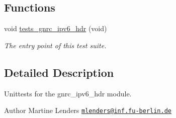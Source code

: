 \subsection*{Functions}
\begin{DoxyCompactItemize}
\item 
void \hyperlink{group__unittests_ga5f40f856d40dbcd2b69c5176f7038062}{tests\+\_\+gnrc\+\_\+ipv6\+\_\+hdr} (void)
\begin{DoxyCompactList}\small\item\em The entry point of this test suite. \end{DoxyCompactList}\end{DoxyCompactItemize}


\subsection{Detailed Description}
Unittests for the {\ttfamily gnrc\+\_\+ipv6\+\_\+hdr} module. 

\begin{DoxyAuthor}{Author}
Martine Lenders \href{mailto:mlenders@inf.fu-berlin.de}{\tt mlenders@inf.\+fu-\/berlin.\+de} 
\end{DoxyAuthor}
